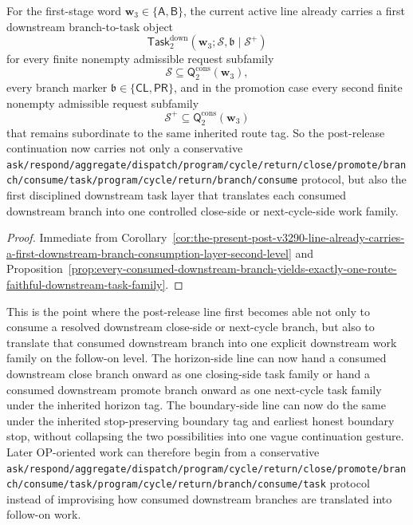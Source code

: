 \begin{corollary}
\label{cor:the-present-post-v3290-line-already-carries-a-first-downstream-branch-to-task-layer-on-the-consumed-follow-on-level}
For the first-stage word \(\mathbf w_3\in\{\mathsf A,\mathsf B\}\), the current active line already carries a first downstream branch-to-task object
\[
 \mathsf{Task}^{\mathrm{down}}_{2}(\mathbf w_3;\mathcal S,\mathfrak b\mid\mathcal S^{+})
\]
for every finite nonempty admissible request subfamily
\[
 \mathcal S\subseteq \mathsf{Q}^{\mathrm{cons}}_{2}(\mathbf w_3),
\]
every branch marker \(\mathfrak b\in\{\mathsf{CL},\mathsf{PR}\}\), and in the promotion case every second finite nonempty admissible request subfamily
\[
 \mathcal S^{+}\subseteq \mathsf{Q}^{\mathrm{cons}}_{2}(\mathbf w_3)
\]
that remains subordinate to the same inherited route tag. So the post-release continuation now carries not only a conservative {\nolinkurl{ask/respond/aggregate/dispatch/program/cycle/return/close/promote/branch/consume/task/program/cycle/return/branch/consume}} protocol, but also the first disciplined downstream task layer that translates each consumed downstream branch into one controlled close-side or next-cycle-side work family.
\end{corollary}

\begin{proof}
Immediate from Corollary~\ref{cor:the-present-post-v3290-line-already-carries-a-first-downstream-branch-consumption-layer-second-level} and Proposition~\ref{prop:every-consumed-downstream-branch-yields-exactly-one-route-faithful-downstream-task-family}.
\end{proof}

\begin{remark}
\label{rem:what-the-first-downstream-branch-to-task-layer-on-the-consumed-follow-on-level-now-buys}
This is the point where the post-release line first becomes able not only to consume a resolved downstream close-side or next-cycle branch, but also to translate that consumed downstream branch into one explicit downstream work family on the follow-on level. The horizon-side line can now hand a consumed downstream close branch onward as one closing-side task family or hand a consumed downstream promote branch onward as one next-cycle task family under the inherited horizon tag. The boundary-side line can now do the same under the inherited stop-preserving boundary tag and earliest honest boundary stop, without collapsing the two possibilities into one vague continuation gesture. Later OP-oriented work can therefore begin from a conservative {\nolinkurl{ask/respond/aggregate/dispatch/program/cycle/return/close/promote/branch/consume/task/program/cycle/return/branch/consume/task}} protocol instead of improvising how consumed downstream branches are translated into follow-on work.
\end{remark}


